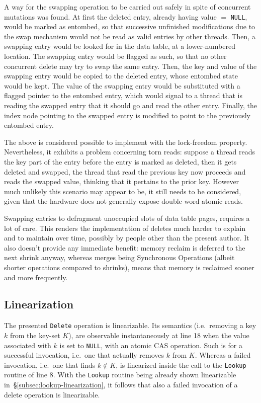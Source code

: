 A way for the swapping operation to be carried out safely in spite of concurrent mutations was found.
At first the deleted entry, already having value $=$ \texttt{NULL}, would be marked as entombed, so that successive unfinished modifications due to the swap mechanism would not be read as valid entries by other threads.
Then, a swapping entry would be looked for in the data table, at a lower-numbered location.
The swapping entry would be flagged as such, so that no other concurrent delete may try to swap the same entry.
Then, the key and value of the swapping entry would be copied to the deleted entry, whose entombed state would be kept.
The value of the swapping entry would be substituted with a flagged pointer to the entombed entry, which would signal to a thread that is reading the swapped entry that it should go and read the other entry.
Finally, the index node pointing to the swapped entry is modified to point to the previously entombed entry.

The above is considered possible to implement with the lock-freedom property.
Nevertheless, it exhibits a problem concerning torn reads: suppose a thread reads the key part of the entry before the entry is marked as deleted, then it gets deleted and swapped, the thread that read the previous key now proceeds and reads the swapped value, thinking that it pertains to the prior key.
However much unlikely this scenario may appear to be, it still needs to be considered, given that the hardware does not generally expose double-word atomic reads.

Swapping entries to defragment unoccupied slots of data table pages, requires a lot of care.
This renders the implementation of deletes much harder to explain and to maintain over time, possibly by people other than the present author.
It also doesn't provide any immediate benefit: memory reclaim is deferred to the next shrink anyway, whereas merges being Synchronous Operations (albeit shorter operations compared to shrinks), means that memory is reclaimed sooner and more frequently.



\subsection{Linearization}\label{subsec:delete-linearization}

The presented \texttt{Delete} operation is linearizable.
Its semantics (i.e.\ removing a key $k$ from the key-set $K$), are observable instantaneously at line 18 when the value associated with $k$ is set to \texttt{NULL}, with an atomic CAS operation.
Such is for a successful invocation, i.e.\ one that actually removes $k$ from $K$.
Whereas a failed invocation, i.e.\ one that finds $k \not\in K$, is linearized inside the call to the \texttt{Lookup} routine of line 8.
With the \texttt{Lookup} routine being already shown linearizable in~\S\ref{subsec:lookup-linearization}, it follows that also a failed invocation of a delete operation is linearizable.

